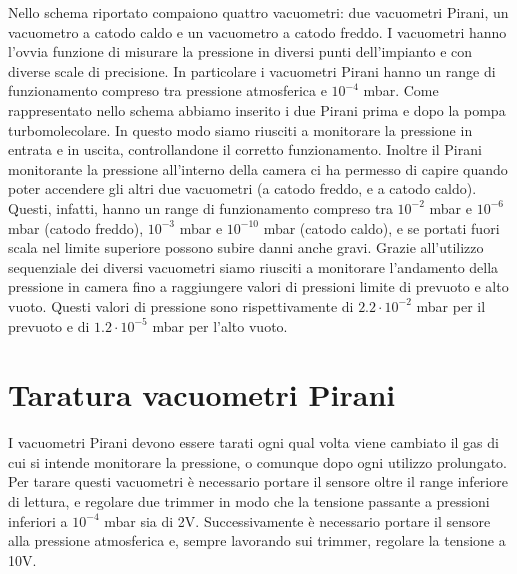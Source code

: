 \documentclass[11pt]{article}
\begin{document}
 \hspace*{5mm}Nello schema riportato compaiono quattro vacuometri: due vacuometri Pirani, un vacuometro a catodo caldo e un vacuometro a catodo freddo. I vacuometri hanno l'ovvia funzione di misurare la pressione in diversi punti dell'impianto e con diverse scale di precisione. In particolare i vacuometri Pirani hanno un range di funzionamento compreso tra pressione atmosferica e $10^{-4}$ mbar. Come rappresentato nello schema abbiamo inserito i due Pirani prima e dopo la pompa turbomolecolare. In questo modo siamo riusciti a monitorare la pressione in entrata e in uscita, controllandone il corretto funzionamento. Inoltre il Pirani monitorante la pressione all'interno della camera ci ha permesso di capire quando poter accendere gli altri due vacuometri (a catodo freddo, e a catodo caldo). Questi, infatti, hanno un range di funzionamento compreso tra $10^{-2}$ mbar e $10^{-6}$ mbar (catodo freddo), $10^{-3}$ mbar e $10^{-10}$ mbar (catodo caldo), e se portati fuori scala nel limite superiore possono subire danni anche gravi. Grazie all'utilizzo sequenziale dei diversi vacuometri siamo riusciti a monitorare l'andamento della pressione in camera fino a raggiungere valori di pressioni limite di prevuoto e alto vuoto. Questi valori di pressione sono rispettivamente di $2.2\cdot10^{-2}$ mbar per il prevuoto e di $1.2\cdot10^{-5}$ mbar per l'alto vuoto.
\section{Taratura vacuometri Pirani}
I vacuometri Pirani devono essere tarati ogni qual volta viene cambiato il gas di cui si intende monitorare la pressione, o comunque dopo ogni utilizzo prolungato. Per tarare questi vacuometri è necessario portare il sensore oltre il range inferiore di lettura, e regolare due trimmer in modo che la tensione passante a pressioni inferiori a $10^{-4}$ mbar sia di 2V. Successivamente è necessario portare il sensore alla pressione atmosferica e, sempre lavorando sui trimmer, regolare la tensione a 10V.

 
 
\end{document}
